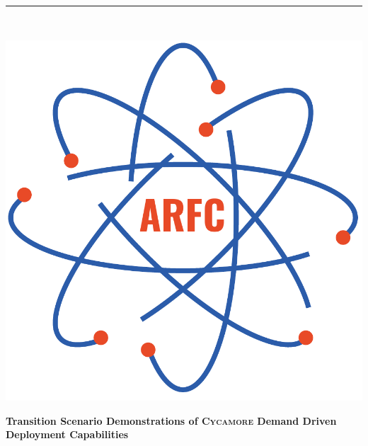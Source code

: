\documentclass[11pt]{article}
\newcommand{\Cycamore}{\textsc{Cycamore}\xspace}%
\begin{document}

\begin{titlepage} %
    \newcommand{\HRule}{\rule{\linewidth}{0.5mm}} %

    \center %


    \HRule\\[0.2cm]

     \begin{minipage}{0.4\textwidth}
        \includegraphics[width=\textwidth]{arfc-logo}
        \end{minipage}%
        \begin{minipage}{0.6\textwidth}
        {\begin{flushright}\huge\bfseries Transition Scenario Demonstrations of 
                \Cycamore Demand Driven Deployment Capabilities\end{flushright}}


\end{minipage}
\end{titlepage}
\end{document}

